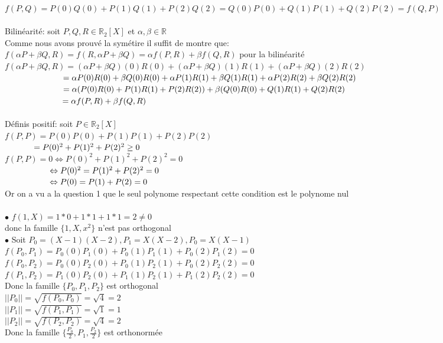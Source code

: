 \documentclass{article}
\newcommand\tab[1][1cm]{\hspace*{#1}}
\begin{document}
$f(P, Q) =  P(0)Q(0) + P(1)Q(1) + P(2)Q(2) =  Q(0)P(0) + Q(1)P(1) + Q(2)P(2) = f(Q, P)$\\
\\
Bilinéarité: soit $P, Q, R \in \mathbb{R}_2[X]$ et $\alpha, \beta \in \mathbb{R}$\\
Comme nous avons prouvé la symétire il suffit de montre que:\\
$f(\alpha P + \beta Q, R) = f(R, \alpha P + \beta Q) = \alpha f(P, R) + \beta f(Q, R)$ pour la bilinéarité\\
$f(\alpha P + \beta Q, R) = (\alpha P + \beta Q)(0)R(0) + (\alpha P + \beta Q)(1)R(1) + (\alpha P + \beta Q)(2)R(2)$\\
$\tab[2.45cm] = \alpha P(0)R(0) + \beta Q(0)R(0) + \alpha P(1)R(1) + \beta Q(1)R(1) + \alpha P(2)R(2) + \beta Q(2)R(2)$
$\tab[2.45cm] = \alpha (P(0)R(0) + P(1)R(1) + P(2)R(2)) + \beta (Q(0)R(0) + Q(1)R(1) + Q(2)R(2)$\\
$\tab[2.45cm] = \alpha f(P, R) + \beta f(Q, R)$\\
\\
Définis positif: soit $P \in \mathbb{R}_2[X]$\\
$f(P, P) = P(0)P(0) + P(1)P(1) + P(2)P(2)$\\
$\tab[1.23cm] = P(0)^2 + P(1)^2 + P(2)^2 \geq 0$\\
$f(P, P) = 0 \Leftrightarrow P(0)^2 + P(1)^2 + P(2)^2 = 0$\\
$\tab[1.9cm] \Leftrightarrow P(0)^2 = P(1)^2 + P(2)^2 = 0$\\
$\tab[1.9cm] \Leftrightarrow P(0) = P(1) + P(2) = 0$\\
Or on a vu a la question 1 que le seul polynome respectant cette condition est le polynome nul\\
\\
$\bullet$ $f(1, X) = 1 * 0 + 1 * 1 + 1 * 1 = 2 \neq 0$\\
donc la famille $\{1, X, x^2\}$ n'est pas orthogonal\\
\newpage
\noindent $\bullet$ Soit $P_0 = (X - 1)(X - 2), P_1 = X(X - 2), P_0 = X(X - 1)$\\
$f(P_0, P_1) = P_0(0)P_1(0) + P_0(1)P_1(1) + P_0(2)P_1(2) = 0$\\
$f(P_0, P_2) = P_0(0)P_2(0) + P_0(1)P_2(1) + P_0(2)P_2(2) = 0$\\
$f(P_1, P_2) = P_1(0)P_2(0) + P_1(1)P_2(1) + P_1(2)P_2(2) = 0$\\
Donc la famille $\{P_0, P_1, P_2\}$ est orthogonal\\
$||P_0|| = \sqrt{f(P_0, P_0)} = \sqrt{4} = 2$\\
$||P_1|| = \sqrt{f(P_1, P_1)} = \sqrt{1} = 1$\\
$||P_2|| = \sqrt{f(P_2, P_2)} = \sqrt{4} = 2$\\
Donc la famille $\{\frac{P_0}{2}, P_1, \frac{P_2}{2}\}$ est orthonormée\\
\end{document}
